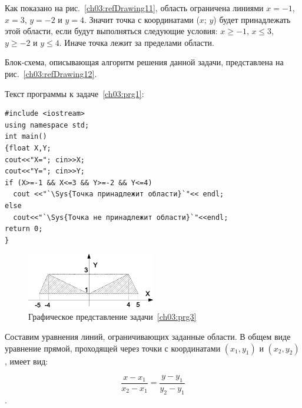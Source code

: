 Как показано на рис.~\ref{ch03:refDrawing11}, область ограничена линиями $x=-1$, $x=3$,
$y=-2$ и $y=4$. Значит точка с координатами ($x$;
$y$) будет принадлежать этой области, если будут выполняться следующие условия: 
$x\geqslant -1$, $x\leqslant 3$, $y\geqslant -2$ и $y\leqslant 4$. Иначе точка лежит за пределами области.

Блок-схема, описывающая алгоритм решения данной задачи, представлена на рис.~\ref{ch03:refDrawing12}.


Текст программы к задаче~\ref{ch03:prg1}:
\begin{lstlisting}
#include <iostream>
using namespace std;
int main()
{float X,Y;
cout<<"X="; cin>>X;
cout<<"Y="; cin>>Y;
if (X>=-1 && X<=3 && Y>=-2 && Y<=4)
  cout <<"`\Sys{Точка принадлежит области}`"<< endl;
else 
  cout<<"`\Sys{Точка не принадлежит области}`"<<endl;
return 0;
}
\end{lstlisting}


\begin{figure}[htb]
\begin{center}
\includegraphics[width=0.5\textwidth]{img/ris_3_14}
\caption{Графическое представление задачи~\ref{ch03:prg3}}
\label{ch03:refDrawing13}
\end{center}
\end{figure}

Составим уравнения линий, ограничивающих заданные области. В общем виде уравнение прямой, проходящей через точки с
координатами  $(x_1,y_1)$ и  $(x_2,y_2)$,  имеет вид:

 $$\frac{x-x_1}{x_2-x_1}=\frac{y-y_1}{y_2-y_1}$$.

